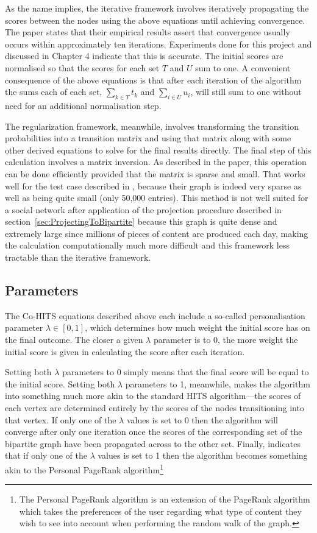 As the name implies, the iterative framework involves iteratively propagating the scores between the nodes using the above equations until achieving convergence. The paper states that their empirical results assert that convergence usually occurs within approximately ten iterations. Experiments done for this project and discussed in Chapter 4 indicate that this is accurate. The initial scores are normalised so that the scores for each set $T$ and $U$ sum to one. A convenient consequence of the above equations is that after each iteration of the algorithm the sums each of each set, $\sum\limits_{k \in T} t_{k}$ and $\sum\limits_{i \in U} u_{i}$, will still sum to one without need for an additional normalisation step.

The regularization framework, meanwhile, involves transforming the transition probabilities into a transition matrix and using that matrix along with some other derived equations to solve for the final results directly. The final step of this calculation involves a matrix inversion. As described in the paper, this operation can be done efficiently provided that the matrix is sparse and small. That works well for the test case described in \cite{Deng2009}, because their graph is indeed very sparse as well as being quite small (only 50,000 entries). This method is not well suited for a social network after application of the projection procedure described in section~\ref{sec:ProjectingToBipartite} because this graph is quite dense and extremely large since millions of pieces of content are produced each day, making the calculation computationally much more difficult and this framework less tractable than the iterative framework.


\subsection{Parameters}
\label{sec:CoHitsParameters}

The Co-HITS equations described above each include a so-called personalisation parameter $\lambda \in [0,1]$, which determines how much weight the initial score has on the final outcome. The closer a given $\lambda$ parameter is to 0, the more weight the initial score is given in calculating the score after each iteration.

Setting both $\lambda$ parameters to 0 simply means that the final score will be equal to the initial score. Setting both $\lambda$ parameters to 1, meanwhile, makes the algorithm into something much more akin to the standard HITS algorithm---the scores of each vertex are determined entirely by the scores of the nodes transitioning into that vertex. If only one of the $\lambda$ values is set to 0 then the algorithm will converge after only one iteration once the scores of the corresponding set of the bipartite graph have been propagated across to the other set. Finally, \cite{Deng2009} indicates that if only one of the $\lambda$ values is set to 1 then the algorithm becomes something akin to the Personal PageRank algorithm\footnote{The Personal PageRank algorithm is an extension of the PageRank algorithm which takes the preferences of the user regarding what type of content they wish to see into account when performing the random walk of the graph.}

